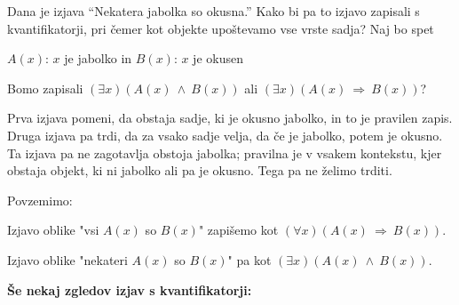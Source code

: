 \documentclass[11pt,paper=b5,footinclude,headinclude]{scrbook} %
\newcounter{example}
\def\inn {{~\wedge~}}
\def\sledi {{~\Rightarrow~}}
\begin{document}
\medskip
\begin{example*}
Dana je izjava ``Nekatera jabolka so okusna.'' Kako bi pa to izjavo zapisali s kvantifikatorji, pri čemer kot objekte upoštevamo vse vrste sadja?
Naj bo spet

$A(x)$: $x$ je jabolko
 in
$B(x)$: $x$ je okusen

Bomo zapisali $(\exists x)(A(x)\inn B(x))$ ali $(\exists x)(A(x) \sledi B(x))$?

Prva izjava pomeni, da obstaja sadje, ki je okusno jabolko, in to je pravilen zapis.
Druga izjava pa trdi, da za vsako sadje velja, da če je jabolko, potem je okusno. Ta izjava pa ne zagotavlja obstoja jabolka;
pravilna je v vsakem kontekstu, kjer obstaja objekt, ki ni jabolko ali pa je okusno. Tega pa ne želimo trditi.
\end{example*}

\medskip
Povzemimo:

{Izjavo oblike "vsi $A(x)$ so $B(x)$" zapišemo kot $(\forall x)(A(x)\sledi B(x))$.

Izjavo oblike "nekateri $A(x)$ so $B(x)$" pa kot $(\exists x)(A(x)\inn B(x))$.}

\medskip

\medskip
\noindent\textbf{ Še nekaj zgledov izjav s kvantifikatorji:}
\end{document}
